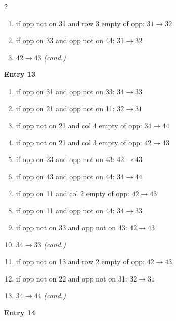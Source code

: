 \begin{multicols}{2}
\begin{tikzpicture}[scale=0.24]
\end{tikzpicture}
\nopagebreak\begin{enumerate}[topsep=1pt,itemsep=0pt,parsep=0pt,leftmargin=2.2em,label=\arabic*.]
\item if opp not on 31 and row 3 empty of opp: $31\!\to\!32$
\item if opp on 33 and opp not on 44: $31\!\to\!32$
\item $42\!\to\!43$ \hfill\textit{(cand.)}
\end{enumerate}\smallskip
\noindent\textbf{Entry 13} \; 
\nopagebreak\begin{enumerate}[topsep=1pt,itemsep=0pt,parsep=0pt,leftmargin=2.2em,label=\arabic*.]
\item if opp on 31 and opp not on 33: $34\!\to\!33$
\item if opp on 21 and opp not on 11: $32\!\to\!31$
\item if opp not on 21 and col 4 empty of opp: $34\!\to\!44$
\item if opp not on 21 and col 3 empty of opp: $42\!\to\!43$
\item if opp on 23 and opp not on 43: $42\!\to\!43$
\item if opp on 43 and opp not on 44: $34\!\to\!44$
\item if opp on 11 and col 2 empty of opp: $42\!\to\!43$
\item if opp on 11 and opp not on 44: $34\!\to\!33$
\item if opp not on 33 and opp not on 43: $42\!\to\!43$
\item $34\!\to\!33$ \hfill\textit{(cand.)}
\item if opp not on 13 and row 2 empty of opp: $42\!\to\!43$
\item if opp not on 22 and opp not on 31: $32\!\to\!31$
\item $34\!\to\!44$ \hfill\textit{(cand.)}
\end{enumerate}\smallskip
\noindent\textbf{Entry 14} \; 
\end{multicols}
